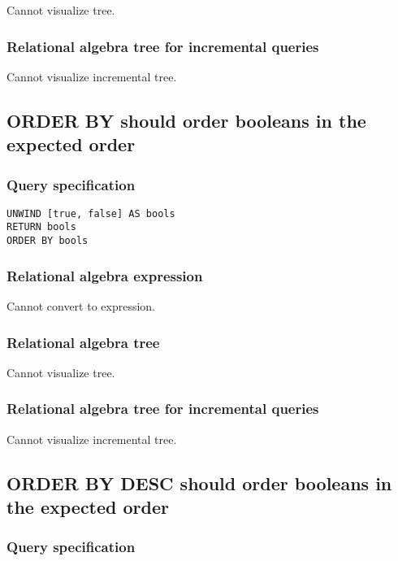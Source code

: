 Cannot visualize tree.

\subsubsection*{Relational algebra tree for incremental queries}

Cannot visualize incremental tree.

\subsection{ORDER BY should order booleans in the expected order}

\subsubsection*{Query specification}

\begin{lstlisting}
UNWIND [true, false] AS bools
RETURN bools
ORDER BY bools
\end{lstlisting}

\subsubsection*{Relational algebra expression}

Cannot convert to expression.

\subsubsection*{Relational algebra tree}

Cannot visualize tree.

\subsubsection*{Relational algebra tree for incremental queries}

Cannot visualize incremental tree.

\subsection{ORDER BY DESC should order booleans in the expected order}

\subsubsection*{Query specification}

